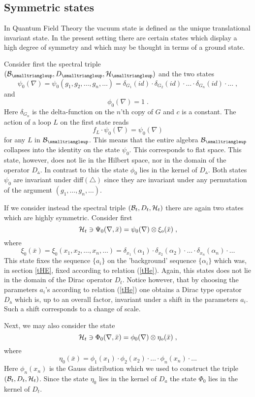 \documentclass[12pt]{article}
\def\a{\alpha}
\def\d{\delta}
\def\cb{{\cal B}}
\def\ch{{\cal H}}
\begin{document}
\begin{appendix}
\section{Symmetric states}


In Quantum Field Theory the vacuum state is defined as the unique translational invariant state. In the present setting there are certain states which display a high degree of symmetry and which may be thought in terms of a ground state.

Consider first the spectral triple $(\cb_{\smalltriangleup},D_{\smalltriangleup},\ch_\smalltriangleup)$ and the two states
\[
\psi_0(\nabla)=\psi_0(g_1,g_2,\ldots,g_n,\ldots)= \d_{G_1}(id)\cdot \d_{G_2}(id)\cdot\ldots\cdot \d_{G_n}(id)\cdot\ldots\;, 
\]
and
\[
\phi_0(\nabla)= 1\;.
\]
Here $\d_{G_n}$ is the delta-function on the $n$'th copy of $G$ and $c$ is a constant. The action of a loop $L$ on the first state reads
\[
f_L\cdot\psi_0(\nabla) = \psi_0(\nabla)
\]
for any $L$ in $\cb_{\smalltriangleup}$. This means that the entire algebra $\cb_{\smalltriangleup}$ collapses into the identity on the state $\psi_0$. This corresponds to flat space. This state, however, does not lie in the Hilbert space, nor in the domain of the operator $D_{\smalltriangleup}$. In contrast to this the state $\phi_0$ lies in the kernel of $D_{\smalltriangleup}$. 
Both states $\psi_0$ are invariant under diff$(\triangle)$ since they are invariant under any permutation of the argument $(g_1,\ldots,g_n,\ldots)$.








If we consider instead the spectral triple $(\cb_t,D_t,\ch_t)$ there are again two states which are highly symmetric. Consider first
\[
\ch_t\ni\Psi_0(\nabla,\bar{x}) = \psi_0(\nabla)\otimes \xi_o(\bar{x})\;,
\]
where
\[
\xi_0(\bar{x})=\xi_0(x_1,x_2,\ldots,x_n,\ldots)=\d_{x_1}(\a_1)\cdot \d_{x_2}(\a_2)\cdot\ldots\cdot \d_{x_n}(\a_n)\cdot\ldots 
\]
This state fixes the sequence $\{a_i\}$ on the 'background' sequence $\{\a_i\}$ which was, in section \ref{tHE}, fixed according to relation (\ref{tHe}). Again, this states does not lie in the domain of the Dirac operator $D_t$. Notice however, that by choosing the parameters $a_i$'s according to relation (\ref{tHe}) one obtains a Dirac type operator $D_{\smalltriangleup}$ which is, up to an overall factor, invariant under a shift in the parameters $a_i$. Such a shift corresponds to a change of scale. 

Next, we may also consider the state
\[
\ch_t\ni\Phi_0(\nabla,\bar{x}) = \phi_0(\nabla)\otimes \eta_o(\bar{x})\;,
\]
where
\[
\eta_0(\bar{x})=\phi_1(x_1)\cdot \phi_{2}(x_2)\cdot\ldots\cdot \phi_{n}(x_n)\cdot\ldots 
\]
Here $\phi_{n}(x_n)$ is the Gauss distribution which we used to construct the triple $(\cb_t,D_t,\ch_t)$. Since the state $\eta_0$ lies in the kernel of $D_a$ the state $\Phi_0$ lies in the kernel of $D_t$. 





\end{appendix}
\end{document}

